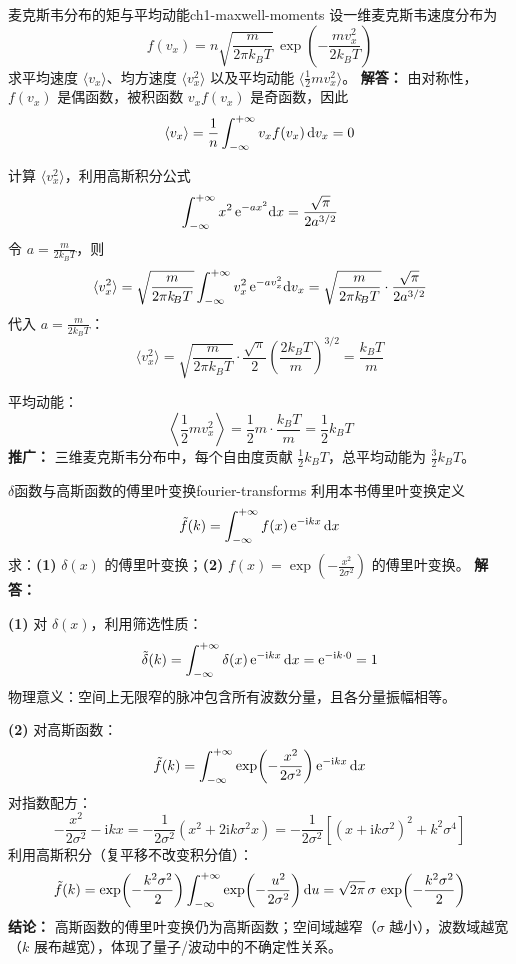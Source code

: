 \begin{example}{麦克斯韦分布的矩与平均动能}{ch1-maxwell-moments}
设一维麦克斯韦速度分布为
\[
f(v_x) = n\sqrt{\frac{m}{2\pi k_{\!B}T}}\,\exp\!\left(-\frac{mv_x^2}{2k_{\!B}T}\right)
\]
求平均速度 $\langle v_x\rangle$、均方速度 $\langle v_x^2\rangle$ 以及平均动能 $\langle \frac{1}{2}mv_x^2\rangle$。
\tcblower
\textbf{解答：}
由对称性，$f(v_x)$ 是偶函数，被积函数 $v_x f(v_x)$ 是奇函数，因此
\[
\langle v_x\rangle = \frac{1}{n}\int_{-\infty}^{+\infty} v_x f(v_x)\,\mathrm{d} v_x = 0
\]

计算 $\langle v_x^2\rangle$，利用高斯积分公式
\[
\int_{-\infty}^{+\infty} x^2 \,\mathrm{e}^{-ax^2}\mathrm{d} x = \frac{\sqrt{\pi}}{2a^{3/2}}
\]
令 $a = \frac{m}{2k_{\!B}T}$，则
\[
\langle v_x^2\rangle = \sqrt{\frac{m}{2\pi k_{\!B}T}}\int_{-\infty}^{+\infty} v_x^2 \,\mathrm{e}^{-av_x^2}\mathrm{d} v_x = \sqrt{\frac{m}{2\pi k_{\!B}T}}\cdot\frac{\sqrt{\pi}}{2a^{3/2}}
\]
代入 $a = \frac{m}{2k_{\!B}T}$：
\[
\langle v_x^2\rangle = \sqrt{\frac{m}{2\pi k_{\!B}T}}\cdot\frac{\sqrt{\pi}}{2}\left(\frac{2k_{\!B}T}{m}\right)^{3/2} = \frac{k_{\!B}T}{m}
\]

平均动能：
\[
\left\langle\frac{1}{2}mv_x^2\right\rangle = \frac{1}{2}m\cdot\frac{k_{\!B}T}{m} = \frac{1}{2}k_{\!B}T
\]
\textbf{推广：} 三维麦克斯韦分布中，每个自由度贡献 $\frac{1}{2}k_{\!B}T$，总平均动能为 $\frac{3}{2}k_{\!B}T$。
\end{example}

\begin{example}{$\delta$函数与高斯函数的傅里叶变换}{fourier-transforms}
利用本书傅里叶变换定义
\[
\tilde{f}(k) = \int_{-\infty}^{+\infty} f(x)\,\mathrm{e}^{-\mathrm{i} kx}\,\mathrm{d} x
\]
求：\textbf{(1)} $\delta(x)$ 的傅里叶变换；\textbf{(2)} $f(x)=\exp\!\left(-\frac{x^2}{2\sigma^2}\right)$ 的傅里叶变换。
\tcblower
\textbf{解答：}

\textbf{(1)} 对 $\delta(x)$，利用筛选性质：
\[
\tilde{\delta}(k) = \int_{-\infty}^{+\infty} \delta(x)\,\mathrm{e}^{-\mathrm{i} kx}\,\mathrm{d} x = \mathrm{e}^{-\mathrm{i} k\cdot 0} = 1
\]
物理意义：空间上无限窄的脉冲包含所有波数分量，且各分量振幅相等。

\textbf{(2)} 对高斯函数：
\[
\tilde{f}(k) = \int_{-\infty}^{+\infty} \exp\!\left(-\frac{x^2}{2\sigma^2}\right)\mathrm{e}^{-\mathrm{i} kx}\,\mathrm{d} x
\]
对指数配方：
\[
-\frac{x^2}{2\sigma^2} - \mathrm{i}kx = -\frac{1}{2\sigma^2}\left(x^2 + 2\mathrm{i}k\sigma^2 x\right) = -\frac{1}{2\sigma^2}\left[(x+\mathrm{i}k\sigma^2)^2 + k^2\sigma^4\right]
\]
利用高斯积分（复平移不改变积分值）：
\[
\tilde{f}(k) = \exp\!\left(-\frac{k^2\sigma^2}{2}\right)\int_{-\infty}^{+\infty} \exp\!\left(-\frac{u^2}{2\sigma^2}\right)\mathrm{d} u = \sqrt{2\pi}\,\sigma\,\exp\!\left(-\frac{k^2\sigma^2}{2}\right)
\]
\textbf{结论：} 高斯函数的傅里叶变换仍为高斯函数；空间域越窄（$\sigma$ 越小），波数域越宽（$k$ 展布越宽），体现了量子/波动中的不确定性关系。
\end{example}

